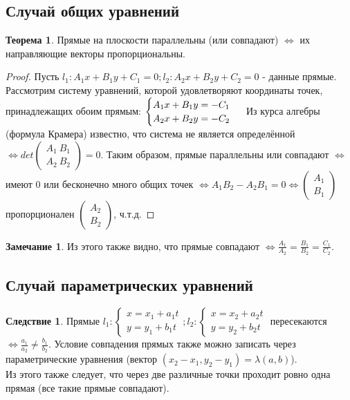 \documentclass[a4paper, 12pt]{article}
\theoremstyle{definition}
\newtheorem*{theorem}{Теорема}
\newtheorem*{consequense}{Следствие}
\newtheorem*{remark}{Замечание}
\begin{document}
	\subsection{Случай общих уравнений}
	\begin{theorem}
		Прямые на плоскости параллельны (или совпадают) $\Leftrightarrow$ их направляющие векторы пропорциональны.
	\end{theorem}
	\begin{proof}
		Пусть $l_{1}: A_{1}x + B_{1}y + C_{1} = 0; l_{2}: A_{2}x + B_{2}y + C_{2} = 0$ - данные прямые.
		Рассмотрим систему уравнений, которой удовлетворяют координаты точек, принадлежащих обоим прямым: $\begin{cases}A_{1}x + B_{1}y = -C_{1}\\A_{2}x + B_{2}y = -C_{2}\end{cases}\\$ Из курса алгебры (формула Крамера) известно, что система не является определённой $\Leftrightarrow det\begin{pmatrix} A_{1} \ B_{1}\\A_{2} \ B_{2}\end{pmatrix} = 0$. Таким образом, прямые параллельны или совпадают $\Leftrightarrow$ имеют 0 или бесконечно много общих точек $\Leftrightarrow A_{1}B_{2} - A_{2}B_{1} = 0 \Leftrightarrow \begin{pmatrix} A_1 \\ B_1 \end{pmatrix}$ пропорционален $\begin{pmatrix} A_2 \\ B_2 \end{pmatrix}$, ч.т.д. 
	\end{proof}
	\begin{remark}
		Из этого также видно, что прямые совпадают $\Leftrightarrow \frac{A_{1}}{A_{2}} = \frac{B_{1}}{B_{2}} = \frac{C_{1}}{C_{2}}$. 
	\end{remark}
	\subsection{Случай параметрических уравнений}
	\begin{consequense}
		Прямые $l_{1}: \begin{cases}x = x_{1} + a_{1}t \\ y = y_{1} + b_{1}t\end{cases}; l_{2}: \begin{cases}x = x_{2} + a_{2}t \\ y = y_{2} + b_{2}t\end{cases}$ пересекаются $\Leftrightarrow \frac{a_{1}}{a_{2}} \neq \frac{b_{1}}{b_{2}}$.
		Условие совпадения прямых также можно записать через параметрические уравнения (вектор $(x_{2} - x_{1}, y_{2} - y_{1}) = \lambda(a, b)$). \\
		Из этого также следует, что через две различные точки проходит ровно одна прямая (все такие прямые совпадают).
	\end{consequense}
\end{document}
